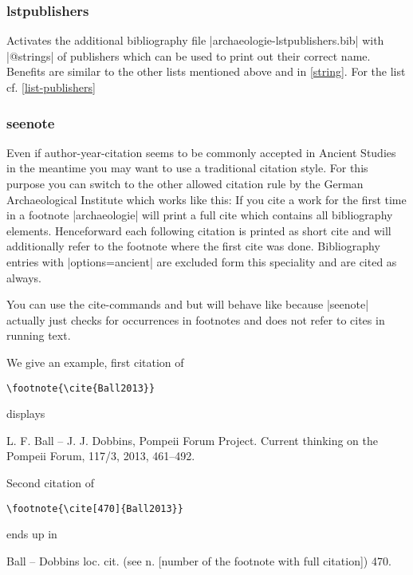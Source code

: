 \documentclass[a4paper,
10pt,
greek,
french,
spanish,
italian,
ngerman,
english
]{ltxdoc}
\begin{document}
\subsubsection{lstpublishers}\label{lstpublishers}
Activates the additional bibliography file |archaeologie-lstpublishers.bib| with |@strings| of publishers which can be used to print out their correct name. 
Benefits are similar to the other lists mentioned above and in \cref{string}.
For the list cf. \cref{list-publishers}




\subsubsection{seenote}\label{seenote}
Even if author-year-citation seems to be commonly accepted in Ancient Studies in the meantime you may want to use a traditional citation style. 
For this purpose you can switch to the other allowed citation rule by the German Archaeological Institute
which works like this:
If you cite a work for the first time in a footnote |archaeologie| will print a full cite which contains all bibliography elements.
Henceforward each following citation is printed as short cite and will additionally refer to the footnote where the first cite was done.
Bibliography entries with |options={ancient}| are excluded form this speciality and are cited as always.

You can use the cite-commands  and  but  will behave like  because |seenote| actually just checks for occurrences in footnotes and does not refer to cites in running text.

We give an example, first citation of 
\begin{lstlisting}
\footnote{\cite{Ball2013}}
\end{lstlisting}

displays

\begin{bsp}
L. F. Ball – J. J. Dobbins, Pompeii Forum Project. Current thinking on the Pompeii Forum, 117/3, 2013, 461–492.
\end{bsp}

Second citation of
\begin{lstlisting}
\footnote{\cite[470]{Ball2013}}
\end{lstlisting}

ends up in

\begin{bsp}
Ball – Dobbins loc. cit. (see n. [number of the footnote with full citation]) 470.
\end{bsp}
\end{document}
